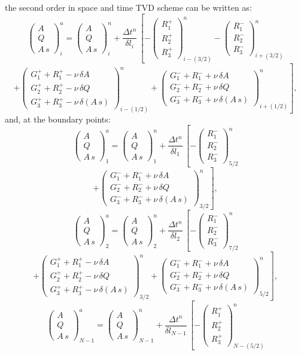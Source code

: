 \documentclass[review,authoryear]{elsarticle}
\newcommand{\eq}[2]{\begin{equation}\label{#2}#1\end{equation}}
\newcommand{\PA}[1] {\left(#1\right)}
\newcommand{\MATRIX}[2] {\PA{\begin{array}{#1}#2\end{array}}}
\newcommand{\IR}{_{i+(1/2)}}
\newcommand{\IRR}{_{i+(3/2)}}
\newcommand{\IL}{_{i-(1/2)}}
\newcommand{\ILL}{_{i-(3/2)}}
\begin{document}
the second order in space and time TVD scheme \citep{JaviTrans} can be written
as: 
\[
	\MATRIX{c}{A\\Q\\A\,s}_i^a=\MATRIX{c}{A\\Q\\A\,s}_i^n
	+\frac{\Delta t^n}{\delta l_i}\,\left[
	-\MATRIX{c}{R_1^+\\R_2^+\\R_3^+}\ILL^n
	-\MATRIX{c}{R_1^-\\R_2^-\\R_3^-}\IRR^n\right.
\]
\eq
{
	\left.+\MATRIX{c}{G_1^++R_1^+-\nu\,\delta A\\
	G_2^++R_2^+-\nu\,\delta Q\\
	G_3^++R_3^+-\nu\,\delta(A\,s)}\IL^n
	+\MATRIX{c}{G_1^-+R_1^-+\nu\,\delta A\\
	G_2^-+R_2^-+\nu\,\delta Q\\
	G_3^-+R_3^-+\nu\,\delta(A\,s)}\IR^n\right],
}{EqSchemeTVD}
and, at the boundary points:
\[
	\MATRIX{c}{A\\Q\\A\,s}_1^a=\MATRIX{c}{A\\Q\\A\,s}_1^n
	+\frac{\Delta t^n}{\delta l_1}\,\left[
	-\MATRIX{c}{R_1^-\\R_2^-\\R_3^-}_{5/2}^n\right.
\]
\[
	\left.+\MATRIX{c}{G_1^-+R_1^-+\nu\,\delta A\\
	G_2^-+R_2^-+\nu\,\delta Q\\
	G_3^-+R_3^-+\nu\,\delta(A\,s)}_{3/2}^n\right],
\]
\[
	\MATRIX{c}{A\\Q\\A\,s}_2^a=\MATRIX{c}{A\\Q\\A\,s}_2^n
	+\frac{\Delta t^n}{\delta l_2}\,\left[
	-\MATRIX{c}{R_1^-\\R_2^-\\R_3^-}_{7/2}^n\right.
\]
\[
	\left.+\MATRIX{c}{G_1^++R_1^+-\nu\,\delta A\\
	G_2^++R_2^+-\nu\,\delta Q\\
	G_3^++R_3^+-\nu\,\delta(A\,s)}_{3/2}^n
	+\MATRIX{c}{G_1^-+R_1^-+\nu\,\delta A\\
	G_2^-+R_2^-+\nu\,\delta Q\\
	G_3^-+R_3^-+\nu\,\delta(A\,s)}_{5/2}^n\right],
\]
\[
	\MATRIX{c}{A\\Q\\A\,s}_{N-1}^a=\MATRIX{c}{A\\Q\\A\,s}_{N-1}^n
	+\frac{\Delta t^n}{\delta l_{N-1}}\,\left[
	-\MATRIX{c}{R_1^+\\R_2^+\\R_3^+}_{N-(5/2)}^n\right.
\]
\end{document}
